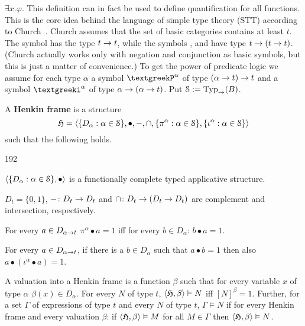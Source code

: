 $\exists x.\varphi$. This definition can in fact be used to 
define quantification for all functions. This is the core idea 
behind the language of 
simple type theory (STT) according to Church~. 
Church assumes that the set of basic categories contains at 
least $t$. The symbol {\mtt{}} has the type $t \rightarrow t$, 
while the symbols {\mtt{}}, {\mtt{}} and
{\mtt{}} have type $t \rightarrow (t \rightarrow t)$. (Church actually works 
only with negation and conjunction as basic symbols, but this 
is just a matter of convenience.) To get the power of 
predicate logic we assume for each type $\alpha$ a symbol 
$\GPi^{\alpha}$ of type $(\alpha \rightarrow t) \rightarrow t$ and a symbol 
$\Giota^{\alpha}$ of type $\alpha \rightarrow (\alpha \rightarrow t)$.
Put $\mathcal{S} := \operatorname{Typ}_{\rightarrow}(B)$.
\begin{defn}
A \textbf{Henkin frame} is a structure 
\begin{equation}
\mathfrak{H} = \langle \{D_{\alpha} : \alpha \in \mathcal{S}\}, \bullet, -, \cap,
\{\pi^{\alpha} : \alpha \in \mathcal{S}\}, 
\{\iota^{\alpha} : \alpha \in \mathcal{S}\}\rangle
\end{equation}
such that the following holds.
\begin{dingautolist}{192}
\item
$\langle \{D_{\alpha} : \alpha \in \mathcal{S}\},
\bullet\rangle$ is a functionally complete typed applicative structure.
\item
$D_t = \{0,1\}$,
$- \colon D_t \rightarrow D_t$ and $\cap \colon D_t \rightarrow (D_t \rightarrow D_t)$ are
complement and intersection, respectively.
\item
For every $a \in D_{\alpha \rightarrow t}$
$\pi^{\alpha} \bullet a = 1$ iff
for every $b \in D_{\alpha}$: $b \bullet a = 1$.
\item
For every $a \in D_{\alpha \rightarrow t}$, if there is a $b \in
D_{\alpha}$ such that $a \bullet b = 1$ then also 
$a \bullet (\iota^{\alpha} \bullet a) = 1$.
\end{dingautolist}
\end{defn}
A valuation into a Henkin frame is a function $\beta$ such that
for every variable $x$ of type $\alpha$ $\beta(x) \in D_{\alpha}$.
For every $N$ of type $t$, $\langle \mathfrak{H}, \beta\rangle \vDash N$ iff 
$[N]^{\beta} = 1$. Further, for a set $\Gamma$ of expressions of 
type $t$ and every $N$ of type $t$, $\Gamma \vDash N$ if
for every Henkin frame and every valuation $\beta$: if $\langle \mathfrak{H},
\beta\rangle \vDash M$ for all $M \in \Gamma$ then $\langle \mathfrak{H}, \beta\rangle
\vDash N$.

